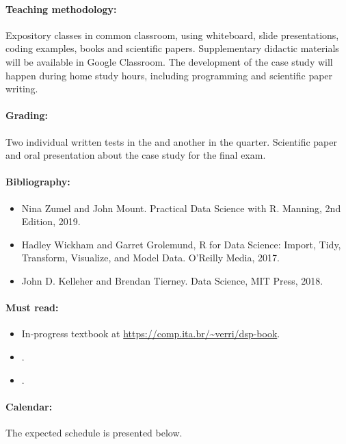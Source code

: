 \paragraph{Teaching methodology:}
Expository classes in common classroom, using whiteboard, slide presentations, coding
examples, books and scientific papers. Supplementary didactic materials will be available
in Google Classroom. The development of the case study will happen during home study
hours, including programming and scientific paper writing.

\paragraph{Grading:} Two individual written tests in the  and another in the  quarter.
Scientific paper and oral presentation about the case study for the final exam.

\paragraph{Bibliography:}
\begin{itemize}
  \item Nina Zumel and John Mount. Practical Data Science with R. Manning, 2nd Edition, 2019.
  \item Hadley Wickham and Garret Grolemund, R for Data Science: Import, Tidy, Transform, Visualize, and Model Data. O’Reilly Media, 2017.
  \item John D. Kelleher and Brendan Tierney. Data Science, MIT Press, 2018.
\end{itemize}

\thispagestyle{empty}
\paragraph{Must read:}
\begin{itemize}
  \item In-progress textbook at \url{https://comp.ita.br/~verri/dsp-book}.
  \item {}.
  \item {}.
\end{itemize}

\paragraph{Calendar:} The expected schedule is presented below.

